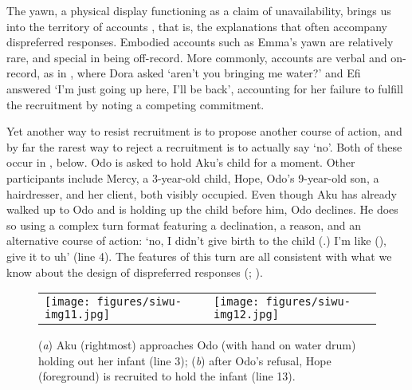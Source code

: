 \documentclass[output=paper]{langsci/langscibook}
\begin{document}
The yawn, a physical display functioning as a claim of unavailability, brings us into the territory of accounts \citep{heritage_explanations_1988}, that is, the explanations that often accompany dispreferred responses. Embodied accounts such as Emma’s yawn are relatively rare, and special in being off-record. More commonly, accounts are verbal and on-record, as in , where Dora asked ‘aren’t you bringing me water?’ and Efi answered ‘I’m just going up here, I’ll be back’, accounting for her failure to fulfill the recruitment by noting a competing commitment.

Yet another way to resist recruitment is to propose another course of action, and by far the rarest way to reject a recruitment is to actually say ‘no’. Both of these occur in , below. Odo is asked to hold Aku’s child for a moment. Other participants include Mercy, a 3-year-old child, Hope, Odo’s 9-year-old son, a hairdresser, and her client, both visibly occupied. Even though Aku has already walked up to Odo and is holding up the child before him, Odo declines. He does so using a complex turn format featuring a declination, a reason, and an alternative course of action: ‘no, I didn’t give birth to the child (.) I’m like (\hspace{0.3cm}), give it to uh’ (line 4). The features of this turn are all consistent with what we know about the design of dispreferred responses (\citealt[334--35]{Levinson1983}; \citealt[265–66]{heritage_garfinkel_1984}).

\begin{figure}
\begin{tabularx}{\textwidth}{ll}
\centering
\texttt{[image: figures/siwu-img11.jpg]} & \texttt{[image: figures/siwu-img12.jpg]}
\end{tabularx}
\caption{(\textit{a}) Aku (rightmost) approaches Odo (with hand on water drum) holding out her infant (line 3); (\textit{b}) after Odo’s refusal, Hope (foreground) is recruited to hold the infant (line 13).}
\label{fig:dingemanse:7}
\end{figure}
\end{document}
